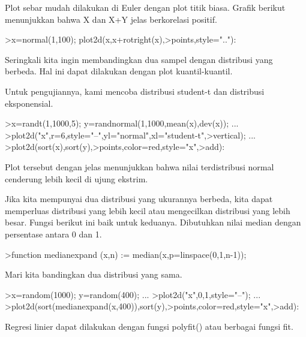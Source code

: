 \documentclass[a4paper,10pt]{article}
\begin{document}
\begin{eulernotebook}
\begin{eulercomment}
\begin{eulercomment}
\begin{eulercomment}
Plot sebar mudah dilakukan di Euler dengan plot titik biasa. Grafik
berikut menunjukkan bahwa X dan X+Y jelas berkorelasi positif.
\end{eulercomment}
\begin{eulerprompt}
>x=normal(1,100); plot2d(x,x+rotright(x),>points,style=".."):
\end{eulerprompt}
\begin{eulercomment}
Seringkali kita ingin membandingkan dua sampel dengan distribusi yang
berbeda. Hal ini dapat dilakukan dengan plot kuantil-kuantil.

Untuk pengujiannya, kami mencoba distribusi student-t dan distribusi
eksponensial.
\end{eulercomment}
\begin{eulerprompt}
>x=randt(1,1000,5); y=randnormal(1,1000,mean(x),dev(x)); ...
>plot2d("x",r=6,style="--",yl="normal",xl="student-t",>vertical); ...
>plot2d(sort(x),sort(y),>points,color=red,style="x",>add):
\end{eulerprompt}
\begin{eulercomment}
Plot tersebut dengan jelas menunjukkan bahwa nilai terdistribusi
normal cenderung lebih kecil di ujung ekstrim.

Jika kita mempunyai dua distribusi yang ukurannya berbeda, kita dapat
memperluas distribusi yang lebih kecil atau mengecilkan distribusi
yang lebih besar. Fungsi berikut ini baik untuk keduanya. Dibutuhkan
nilai median dengan persentase antara 0 dan 1.
\end{eulercomment}
\begin{eulerprompt}
>function medianexpand (x,n) := median(x,p=linspace(0,1,n-1));
\end{eulerprompt}
\begin{eulercomment}
Mari kita bandingkan dua distribusi yang sama.
\end{eulercomment}
\begin{eulerprompt}
>x=random(1000); y=random(400); ...
>plot2d("x",0,1,style="--"); ...
>plot2d(sort(medianexpand(x,400)),sort(y),>points,color=red,style="x",>add):
\end{eulerprompt}
\begin{eulercomment}
Regresi linier dapat dilakukan dengan fungsi polyfit() atau berbagai
fungsi fit.


\end{eulercomment}
\end{eulercomment}
\end{eulercomment}
\end{eulernotebook}
\end{document}
